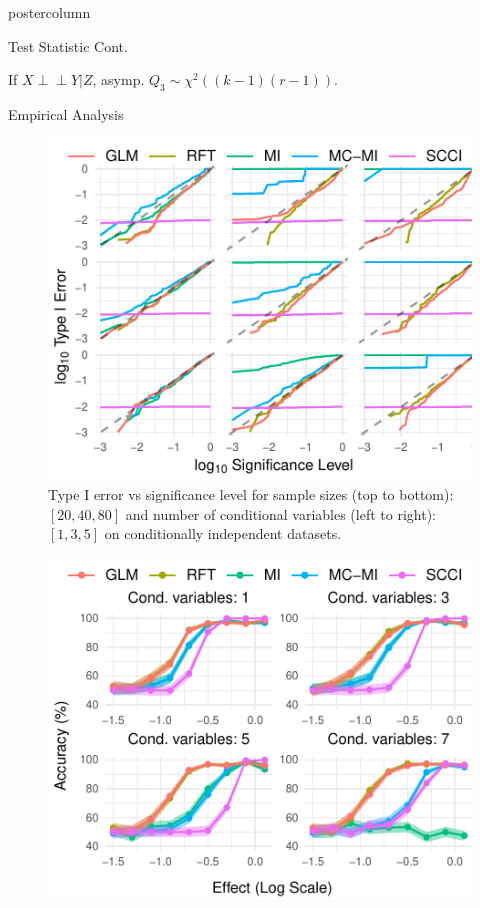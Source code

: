 \documentclass{beamer}
\def\ci{\perp\!\!\!\!\!\perp}
\begin{document}
\begin{frame}
\begin{columns}
\begin{column}{.33\textwidth}
\begin{beamercolorbox}[center]{postercolumn}
\begin{minipage}{.98\textwidth}
{\begin{myblock}{Test Statistic Cont.}
\begin{itemize}
							If $ X \ci Y | Z $, asymp. $ Q_3 \sim \chi^2((k-1)(r-1)) $.
						\end{itemize}

					\end{myblock}\vfill
					\begin{myblock}{Empirical Analysis}
						\begin{figure}
							\centering
							\includegraphics[scale=3]{../in_person/imgs/calibration_add_vars.pdf}
							\caption{Type I error vs significance level for sample sizes (top to
							bottom): $ [20, 40, 80] $ and number of conditional variables (left to
							right): $ [1, 3, 5] $ on conditionally independent datasets.}
							\label{fig:calibration}
						\end{figure}
						\begin{figure}
							\centering
							\includegraphics[scale=3]{../in_person/imgs/accuracy.pdf}

\end{figure}
\end{myblock}}
\end{minipage}
\end{beamercolorbox}
\end{column}
\end{columns}
\end{frame}
\end{document}
